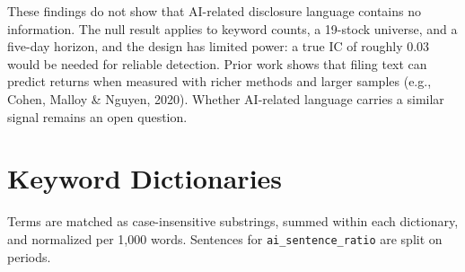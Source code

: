 \documentclass[10pt,letterpaper,twocolumn]{article}
\begin{document}
These findings do not show that AI-related disclosure language contains no information. The null result applies to keyword counts, a 19-stock universe, and a five-day horizon, and the design has limited power: a true IC of roughly 0.03 would be needed for reliable detection. Prior work shows that filing text can predict returns when measured with richer methods and larger samples (e.g., Cohen, Malloy \& Nguyen, 2020). Whether AI-related language carries a similar signal remains an open question.

{\small


}

\onecolumn
\appendix
\section{Keyword Dictionaries}
\label{app:keywords}

Terms are matched as case-insensitive substrings, summed within each dictionary, and normalized per 1,000 words. Sentences for \texttt{ai\_sentence\_ratio} are split on periods.
\end{document}
